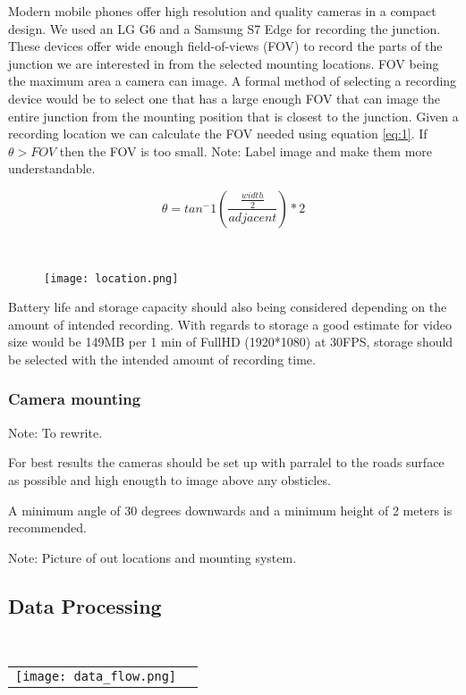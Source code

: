 Modern mobile phones offer high resolution and quality cameras in a compact design. We used an LG G6 and a Samsung S7 Edge for recording the junction.
These devices offer wide enough field-of-views (FOV) to record the parts of the junction we are interested in from the selected mounting locations.
FOV being the maximum area a camera can image. A formal method of selecting a recording device would be to select one that has a large enough FOV that can image the entire junction 
from the mounting position that is closest to the junction. Given a recording location we can calculate the FOV needed using equation \ref{eq:1}.
If $\theta > FOV$ then the FOV is too small. 
Note: Label image and make them more understandable.

\begin{equation}
    \theta = tan^-1(\frac{\frac{width}{2}}{adjacent}) * 2\label{eq:1}
  \end{equation}

\ \\ 
  \begin{figure}[h]
    \texttt{[image: location.png]}
    \centering 
    \end{figure}
    \label{Camera location}

Battery life and storage capacity should also being considered depending on the amount of intended recording. 
With regards to storage a good estimate for video size would be 149MB per 1 min of FullHD (1920*1080) at 30FPS, storage should be selected
with the intended amount of recording time.

\subsubsection{Camera mounting}

Note: To rewrite.

For best results the cameras should be set up with parralel to the roads surface as possible and high enougth to 
image above any obsticles.

A minimum angle of 30 degrees downwards and a minimum height of 2 meters is recommended.

Note: Picture of out locations and mounting system.

\subsection{Data Processing}

\ \\ 
\noindent
\begin{tabular}{@{}cc}
\texttt{[image: data\_flow.png]} 
\end{tabular}
\label{data}


